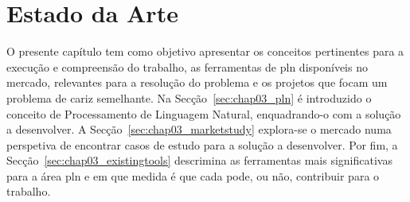 \chapter{Estado da Arte}
\label{chap:Chapter3}
O presente capítulo tem como objetivo apresentar os conceitos pertinentes para a execução e compreensão do trabalho, as ferramentas de \gls{pln} disponíveis no mercado, relevantes para a resolução do problema e os projetos que focam um problema de cariz semelhante. Na Secção~\ref{sec:chap03_pln} é introduzido o conceito de Processamento de Linguagem Natural, enquadrando-o com a solução a desenvolver. A Secção~\ref{sec:chap03_marketstudy} explora-se o mercado numa perspetiva de encontrar casos de estudo para a solução a desenvolver. Por fim, a Secção~\ref{sec:chap03_existingtools} descrimina as ferramentas mais significativas para a área \gls{pln} e em que medida é que cada pode, ou não, contribuir para o trabalho.






